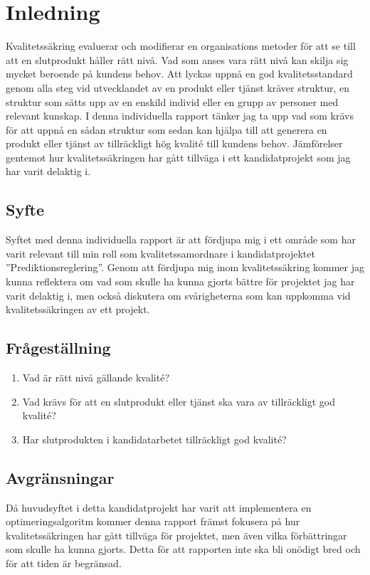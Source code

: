 \section{Inledning}
Kvalitetssäkring evaluerar och modifierar en organisations metoder för att se till att en slutprodukt håller rätt nivå. Vad som anses vara rätt nivå kan skilja sig mycket beroende på kundens behov. 
\newline
\newline
Att lyckas uppnå en god kvalitetsstandard genom alla steg vid utvecklandet av en produkt eller tjänst kräver struktur, en struktur som sätts upp av en enskild individ eller en grupp av personer med relevant kunskap. I denna individuella rapport tänker jag ta upp vad som krävs för att uppnå en sådan struktur som sedan kan hjälpa till att generera en produkt eller tjänst av tillräckligt hög kvalité till kundens behov. Jämförelser gentemot hur kvalitetssäkringen har gått tillväga i ett kandidatprojekt som jag har varit delaktig i.

\subsection{Syfte}
Syftet med denna individuella rapport är att fördjupa mig i ett område som har varit relevant till min roll som kvalitetssamordnare i kandidatprojektet ''Prediktionsreglering''. 
\newline
\newline
Genom att fördjupa mig inom kvalitetssäkring kommer jag kunna reflektera om vad som skulle ha kunna gjorts bättre för projektet jag har varit delaktig i, men också diskutera om svårigheterna som kan uppkomma vid kvalitetssäkringen av ett projekt.

\subsection{Frågeställning}

\begin{enumerate}
  \item Vad är rätt nivå gällande kvalité?
  \item Vad krävs för att en slutprodukt eller tjänst ska vara av tillräckligt god kvalité?
  \item Har slutprodukten i kandidatarbetet tillräckligt god kvalité?
\end{enumerate}

\subsection{Avgränsningar}

Då huvudsyftet i detta kandidatprojekt har varit att implementera en optimeringsalgoritm kommer denna rapport främst fokusera på hur kvalitetssäkringen har gått tillväga för projektet, men även vilka förbättringar som skulle ha kunna gjorts. Detta för att rapporten inte ska bli onödigt bred och för att tiden är begränsad.


